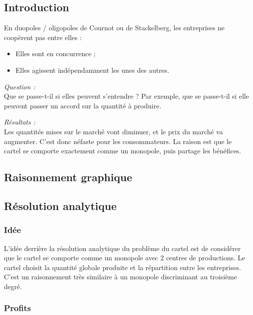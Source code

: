 \documentclass[
]{book}
\providecommand{\tightlist}{%
  \setlength{\itemsep}{0pt}\setlength{\parskip}{0pt}}
\theoremstyle{definition}
\theoremstyle{definition}
\theoremstyle{definition}
\theoremstyle{definition}
\theoremstyle{remark}
\begin{document}
\hypertarget{introduction-3}{%
\subsection{Introduction}\label{introduction-3}}

En duopoles / oligopoles de Cournot ou de Stackelberg, les entreprises ne coopèrent pas entre elles :

\begin{itemize}
\tightlist
\item
  Elles sont en concurrence ;
\item
  Elles agissent indépendamment les unes des autres.
\end{itemize}

\emph{Question :}\\
Que se passe-t-il si elles peuvent s'entendre ?
Par exemple, que se passe-t-il si elle peuvent passer un accord sur la quantité à produire.

\emph{Résultats :}\\
Les quantités mises sur le marché vont diminuer, et le prix du marché va augmenter.
C'est donc néfaste pour les consommateurs.
La raison est que le cartel se comporte exactement comme un monopole, puis partage les bénéfices.

\hypertarget{raisonnement-graphique}{%
\subsection{Raisonnement graphique}\label{raisonnement-graphique}}

\hypertarget{ruxe9solution-analytique}{%
\subsection{Résolution analytique}\label{ruxe9solution-analytique}}

\hypertarget{iduxe9e}{%
\subsubsection{Idée}\label{iduxe9e}}

L'idée derrière la résolution analytique du problème du cartel est de considérer que le cartel se comporte comme un monopole avec 2 centres de productions.
Le cartel choisit la quantité globale produite et la répartition entre les entreprises.
C'est un raisonnement très similaire à un monopole discriminant au troisième degré.

\hypertarget{profits-2}{%
\subsubsection{Profits}\label{profits-2}}
\end{document}
